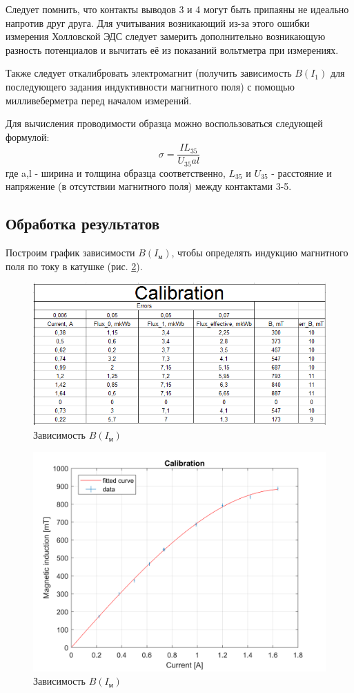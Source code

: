 \documentclass{article}
\begin{document}
	Следует помнить, что контакты выводов 3 и 4 могут быть припаяны не идеально напротив друг друга. Для учитывания возникающий из-за этого ошибки измерения Холловской ЭДС следует замерить дополнительно возникающую разность потенциалов и вычитать её из показаний вольтметра при измерениях.
	
	Также следует откалибровать электромагнит (получить зависимость $B(I_1)$ для последующего задания индуктивности магнитного поля) с помощью милливеберметра перед началом измерений.

	Для вычисления проводимости образца можно воспользоваться следующей формулой: $$ \sigma = \frac{IL_{35}}{U_{35}al} $$ где a,l - ширина и толщина образца соответственно, $L_{35}$ и $U_{35}$ - расстояние и напряжение (в отсутствии магнитного поля) между контактами 3-5.
	 
	\newpage
   \subsection*{Обработка результатов}
   Построим график зависимости $B(I_{\text{м}})$, чтобы определять индукцию магнитного поля по току в катушке (рис. \ref{fig.2}).
   
   \begin{figure}[h]
   \centering
   \includegraphics[width=15cm]{Table1.png} 
   \caption{Зависимость $B(I_{\text{м}})$} 
   \label{t1} 
   \end{figure}

   
   
   \begin{figure}[h]
   \centering
   \includegraphics[width=12cm]{CalibrationPlot.png} 
   \caption{Зависимость $B(I_{\text{м}})$} 
   \label{fig.2} 
   \end{figure}
\end{document}
